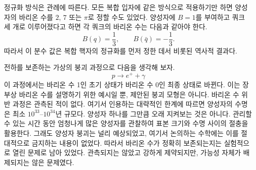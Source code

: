 \begin{classroomqa}
\end{classroomqa}

정규화 방식은 관례에 따른다. 모든 복합 입자에 같은 방식으로 적용하기만 하면 양성자의 바리온 수를 \(2\), \(7\) 또는 \(\pi\)로 정할 수도 있었다. 양성자에 \(B=1\)를 부여하고 쿼크 세 개로 이루어졌다고 하면 각 쿼크의 바리온 수는 다음과 같아야 한다.
\begin{equation}
B(q)=\frac13,
\qquad
B(\bar q)=-\frac13.
\end{equation}
따라서 이 분수 값은 복합 핵자의 정규화를 먼저 정한 데서 비롯된 역사적 결과다.

\begin{classroomqa}
\end{classroomqa}

전하를 보존하는 가상의 붕괴 과정으로 다음을 생각해 보자.
\begin{equation}
p\longrightarrow e^++\gamma
\end{equation}
이 과정에서는 바리온 수 1인 초기 상태가 바리온 수 0인 최종 상태로 바뀐다. 이는 장부상 바리온 수를 설명하기 위한 예시일 뿐, 제안된 붕괴 모형은 아니다. 바리온 수 위반 과정은 관측된 적이 없다. 여기서 인용하는 대략적인 한계에 따르면 양성자의 수명은 최소 \(10^{33}\)--\(10^{34}\)년 규모다. 양성자 하나를 그만큼 오래 지켜보는 것은 아니다. 관리할 수 있는 시간 동안 엄청나게 많은 양성자를 관찰하여 표본 크기와 수명 사이의 절충을 활용한다. 그래도 양성자 붕괴는 널리 예상되었고, 여기서 논의하는 수학에는 이를 절대적으로 금지하는 내용이 없었다. 따라서 바리온 수가 정확히 보존되는지는 실험적으로 열린 문제로 남아 있었다. 관측되지는 않았고 강하게 제약되지만, 가능성 자체가 배제되지는 않은 문제였다.

\begin{classroomqa}
\end{classroomqa}

